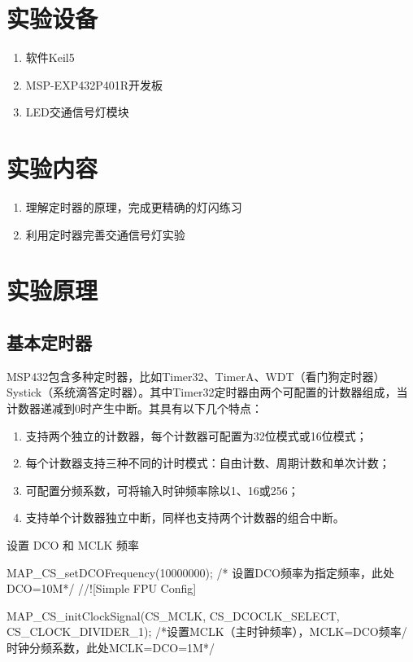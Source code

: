 \documentclass[a4paper,10pt,UTF8]{paper}
\numberwithin{equation}{section}
\numberwithin{figure}{section}
\begin{document}
\section{实验设备}

\begin{enumerate}
    \item 软件Keil5
    \item MSP-EXP432P401R开发板
    \item LED交通信号灯模块
\end{enumerate}

\section{实验内容}

\begin{enumerate}
    \item 理解定时器的原理，完成更精确的灯闪练习
    \item 利用定时器完善交通信号灯实验
\end{enumerate}

\section{实验原理}

\subsection{基本定时器}

MSP432包含多种定时器，比如Timer32、TimerA、WDT（看门狗定时器）Systick（系统滴答定时器）。其中Timer32定时器由两个可配置的计数器组成，当计数器递减到0时产生中断。其具有以下几个特点：

\begin{enumerate}
    \item 支持两个独立的计数器，每个计数器可配置为32位模式或16位模式；
    \item 每个计数器支持三种不同的计时模式：自由计数、周期计数和单次计数；
    \item 可配置分频系数，可将输入时钟频率除以1、16或256；
    \item 支持单个计数器独立中断，同样也支持两个计数器的组合中断。
\end{enumerate}

设置 DCO 和 MCLK 频率

\begin{ccode}
    MAP_CS_setDCOFrequency(10000000); /* 设置DCO频率为指定频率，此处DCO=10M*/
    //![Simple FPU Config]
    
    MAP_CS_initClockSignal(CS_MCLK, CS_DCOCLK_SELECT, CS_CLOCK_DIVIDER_1); 
    /*设置MCLK（主时钟频率），MCLK=DCO频率/时钟分频系数，此处MCLK=DCO=1M*/
\end{ccode}
\end{document}
